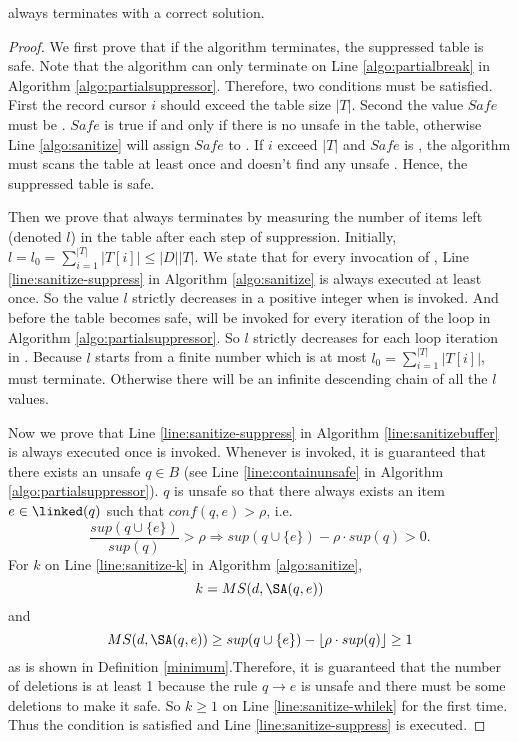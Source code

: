 \begin{theorem}
\label{CorrectnessOfPartialSuppressor}
  \PartialSuppressor always terminates with a correct solution.
\end{theorem}
\begin{proof}
We first prove that if the algorithm terminates, the suppressed table is safe.
Note that the algorithm can only terminate on Line \ref{algo:partialbreak}
  in Algorithm \ref{algo:partialsuppressor}.
  Therefore, two conditions must be satisfied. First the record cursor $i$ should
  exceed the table size $|T|$. Second the value $Safe$ must be \TRUE. $Safe$ is true
  if and only if there is no unsafe \qids in the table, otherwise  Line \ref{algo:sanitize}
 will assign $Safe$ to \FALSE. If $i$ exceed $|T|$ and $Safe$ is \TRUE, the algorithm
must scans the table at least once and doesn't find any unsafe \qids. Hence, the
 suppressed table is safe.


Then we prove that \PartialSuppressor always terminates by measuring the
  number of items left (denoted $l$) in the table after each step of suppression.
Initially, $l=l_0=\sum_{i=1}^{|T|} |T[i]|\le |D| |T|$.
We state that for every invocation of \SanitizeBuffer, Line \ref{line:sanitize-suppress}
  in Algorithm \ref{algo:sanitize} is always executed at least once.
So the value $l$ strictly decreases in a positive integer
when \SanitizeBuffer is invoked.
And before the table becomes safe, \SanitizeBuffer will be invoked for
  every iteration of the loop in Algorithm \ref{algo:partialsuppressor}.
So $l$ strictly decreases for each loop iteration in \PartialSuppressor.
Because $l$ starts from a finite number which is at most $l_0=\sum_{i=1}^{|T|} |T[i]|$,
  \PartialSuppressor must terminate.
Otherwise there will be an infinite descending chain of all the $l$ values.


Now we prove that Line \ref{line:sanitize-suppress} in Algorithm \ref{line:sanitizebuffer}
  is always executed once \SanitizeBuffer is invoked.
Whenever \SanitizeBuffer is invoked, it is guaranteed that there exists
  an unsafe \qid $q\in B$ (see Line \ref{line:containunsafe}  in Algorithm \ref{algo:partialsuppressor}).
$q$ is unsafe so that there always exists an item $e\in\linked(q)$ such that $conf(q,e)>\rho$,
  i.e. \[ \frac{sup(q\cup\{e\})}{sup(q)}>\rho \Rightarrow
   sup(q\cup\{e\})-\rho\cdot sup(q)>0 .\]
For $k$ on Line \ref{line:sanitize-k} in Algorithm \ref{algo:sanitize},
  \[ k = MS(d,\SA(q,e))\]
  and
  \[MS(d,\SA(q,e)) \geq sup(q\cup\{e\})-\lfloor\rho\cdot sup(q)\rfloor \ge 1\]
  as is shown in Definition \ref{minimum}.Therefore,
  it is guaranteed that the number of deletions is at least 1
  because the rule $q\rightarrow e$ is unsafe and there must be some deletions to make it safe.
So $k\ge 1$ on Line \ref{line:sanitize-whilek} for the first time.
Thus the condition is satisfied and Line \ref{line:sanitize-suppress} is executed.
\end{proof}

